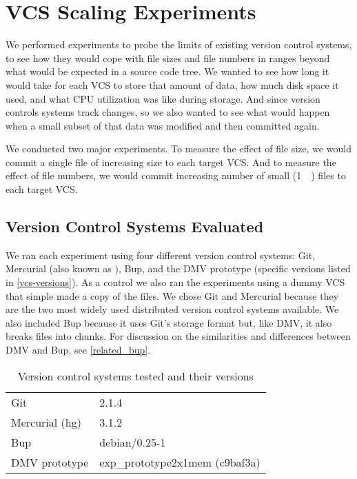 \chapter{VCS Scaling Experiments}
\label{num-files-exp-desc}
\label{file-size-exp-desc}


We performed experiments to probe the limits of existing version control
systems, to see how they would cope with file sizes and file numbers in ranges
beyond what would be expected in a source code tree. We wanted to see how long
it would take for each VCS to store that amount of data, how much disk space it
used, and what CPU utilization was like during storage. And since version
controls systems track changes, so we also wanted to see what would happen when
a small subset of that data was modified and then committed again.

We conducted two major experiments. To measure the effect of file size, we would
commit a single file of increasing size to each target VCS. And to measure
the effect of file numbers, we would commit increasing number of small
(\SI{1}{\kibi\byte}) files to each target VCS.



\section{Version Control Systems Evaluated}

We ran each experiment using four different version control systems: Git,
Mercurial (also known as ), Bup, and the DMV prototype (specific
versions listed in \autoref{vcs-versions}). As a control we also ran the
experiments using a dummy VCS that simple made a copy of the files. We chose Git
and Mercurial because they are the two most widely used distributed version
control systems available. We also included Bup because it uses Git's storage
format but, like DMV, it also breaks files into chunks. For discussion on the
similarities and differences between DMV and Bup, see \autoref{related_bup}.


\begin{table}
    \caption{Version control systems tested and their versions}
    \label{vcs-versions}
    \centering
    \begin{tabular}{ l l }
        Git & 2.1.4 \\
        Mercurial (hg) & 3.1.2 \\
        Bup & debian/0.25-1 \\
        DMV prototype & exp\_prototype2x1mem (c9baf3a) \\
    \end{tabular}
\end{table}


